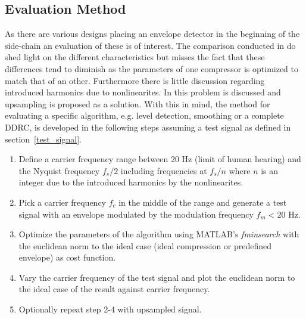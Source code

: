 \documentclass[../main2.tex]{subfiles}
\begin{document}
\subsection{Evaluation Method} \label{method_evaluation}
As there are various designs placing an envelope detector in the beginning of the side-chain an evaluation of these is of interest. The comparison conducted in \cite{reiss2012tutorial} do shed light on the different characteristics but misses the fact that these differences tend to diminish as the parameters of one compressor is optimized to match that of an other. Furthermore there is little discussion regarding introduced harmonics due to nonlinearites. In \cite{frindle1996implementation} this problem is discussed and upsampling is proposed as a solution. With this in mind, the method for evaluating a specific algorithm, e.g. level detection, smoothing or a complete DDRC, is developed in the following steps assuming a test signal as defined in section~\ref{test_signal}.
\begin{enumerate}
\item{Define a carrier frequency range between 20 Hz (limit of human hearing) and the Nyquist frequency $f_s/2$ including frequencies at $f_s/n$ where $n$ is an integer due to the introduced harmonics by the nonlinearites.}
\item{Pick a carrier frequency $f_c$ in the middle of the range and generate a test signal with an envelope modulated by the modulation frequency $f_m < 20$ Hz.}

\item{Optimize the parameters of the algorithm using  MATLAB\textsuperscript{\textregistered}'s \emph{fminsearch} with the euclidean norm to the ideal case (ideal compression or predefined envelope) as cost function.}
\item{Vary the carrier frequency of the test signal and plot the euclidean norm to the ideal case of the result against carrier frequency.}
\item{Optionally repeat step 2-4 with upsampled signal.}
\end{enumerate}
\end{document}
